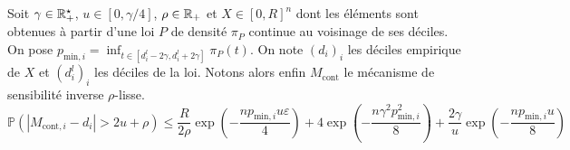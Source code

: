 \begin{theorem}
    Soit \(\gamma \in \mathbb{R}_+^\star\), \(u \in [0, \gamma/4]\), \(\rho \in \mathbb{R}_+\) et \(X \in [0,R]^n\) dont les éléments sont obtenues à partir d'une loi \(P\) de densité \(\pi_P\) continue au voisinage de ses déciles. On pose \(p_{\text{min}, i} = \inf_{t \in [d_i^l - 2\gamma, d_i^l + 2\gamma]} \pi_P(t)\). On note \((d_i)_i\) les déciles empirique de \(X\) et \((d_i^l)_i\) les déciles de la loi. Notons alors enfin \(M_{\text{cont}}\) le mécanisme de sensibilité inverse \(\rho\)-lisse.
    \[
        \mathbb P\left( |M_{\text{cont}, i} - d_i| > 2u + \rho\right) \leq \dfrac{R}{2\rho}\exp\left(- \dfrac{np_{\text{min}, i}u\varepsilon}{4} \right) + 4\exp\left(- \dfrac{n\gamma^2p_{\text{min},i}^2}{8} \right) + \dfrac{2\gamma}{u}\exp\left( -\dfrac{np_{\text{min},i}u}{8} \right)
    \]
\end{theorem}


